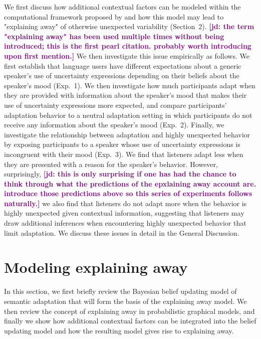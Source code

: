 \documentclass[man,floatsintext]{apa6}
\newcommand{\jd}[1]{\textcolor{Purple}{\bf [jd: #1]}}
\begin{document}
We first discuss how additional contextual factors can be modeled within the computational framework proposed by  and how this model may lead to "explaining away" \cite{Pearl1988} of otherwise unexpected variability (Section~2). \jd{the term "explaining away" has been used multiple times without being introduced; this is the first pearl citation. probably worth introducing upon first mention.}  We then investigate this issue empirically as follows. We first establish that language users have different expectations about a generic speaker's use of uncertainty expressions depending on their beliefs about the speaker's mood (Exp.~1). We then investigate how much participants adapt when they are provided with information about the speaker's mood that makes their use of uncertainty expressions more expected, and compare participants' adaptation behavior to a neutral adaptation setting in which participants do not receive any information about the speaker's mood (Exp.~2). Finally, we investigate the relationship between adaptation and highly unexpected behavior by exposing participants to a speaker whose use of uncertainty expressions is incongruent with their mood (Exp.~3). We find that listeners adapt less when they are presented with a reason for the speaker's behavior. However, surprisingly, \jd{this is only surprising if one has had the chance to think through what the predictions of the epxlaining away account are. introduce those predictions above so this series of experiments follows naturally.} we also find that listeners do not adapt more when the behavior is highly unexpected given contextual information, suggesting that listeners may draw additional inferences when encountering highly unexpected behavior that limit adaptation. We discuss these issues in detail in the General Discussion.

\section{Modeling explaining away}
\label{sec:model}

In this section, we first briefly review the Bayesian belief updating model of semantic adaptation that will form the basis of the explaining away model. We then review the concept of explaining away in probabilistic graphical models, and finally we show how additional contextual factors can be integrated into the belief updating model and how the resulting model gives rise to explaining away.
\end{document}
